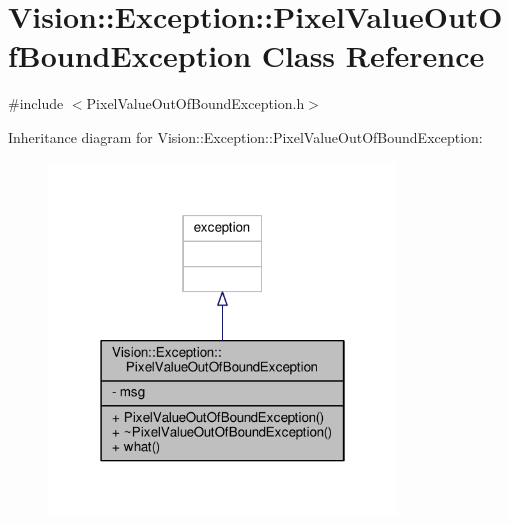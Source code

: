 \hypertarget{class_vision_1_1_exception_1_1_pixel_value_out_of_bound_exception}{}\section{Vision\+:\+:Exception\+:\+:Pixel\+Value\+Out\+Of\+Bound\+Exception Class Reference}
\label{class_vision_1_1_exception_1_1_pixel_value_out_of_bound_exception}


{\ttfamily \#include $<$Pixel\+Value\+Out\+Of\+Bound\+Exception.\+h$>$}



Inheritance diagram for Vision\+:\+:Exception\+:\+:Pixel\+Value\+Out\+Of\+Bound\+Exception\+:\nopagebreak
\begin{figure}[H]
\begin{center}
\leavevmode
\includegraphics[width=262pt]{class_vision_1_1_exception_1_1_pixel_value_out_of_bound_exception__inherit__graph}
\end{center}
\end{figure}


